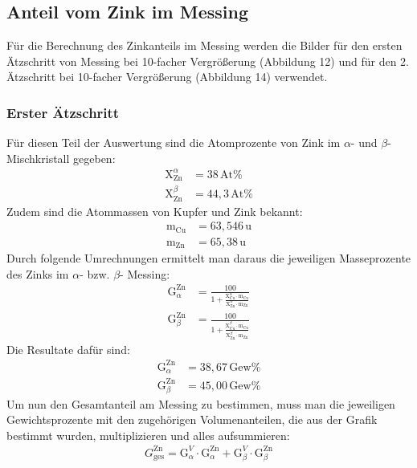 \documentclass[german,  %
parskip=full,  %
]{scrartcl}
\begin{document}
\subsection{Anteil vom Zink im Messing}
Für die Berechnung des Zinkanteils im Messing werden die Bilder für den ersten Ätzschritt von Messing bei 10-facher Vergrößerung (Abbildung 12) und für den 2. Ätzschritt bei 10-facher Vergrößerung (Abbildung 14) verwendet.
\subsubsection{Erster Ätzschritt}
Für diesen Teil der Auswertung sind die Atomprozente von Zink im $\alpha$- und $\beta$-Mischkristall gegeben:
\begin{align*}
\text{X}_{\text{Zn}}^{\alpha} &= 38 \, \text{At}\% \\
\text{X}_{\text{Zn}}^{\beta} &= 44,3 \, \text{At}\%
\end{align*}
Zudem sind die Atommassen von Kupfer und Zink bekannt:
\begin{align*}
\text{m}_{\text{Cu}} &= 63,546 \, \text{u} \\
\text{m}_{\text{Zn}} &= 65,38 \, \text{u}
\end{align*}
Durch folgende Umrechnungen ermittelt man daraus die jeweiligen Masseprozente des Zinks im $\alpha$- bzw. $\beta$- Messing:
\begin{align*}
\text{G}_{\alpha}^{\text{Zn}} &= \frac{100}{1+\frac{\text{X}_{\text{Cu}}^{\alpha} \cdot \text{m}_{\text{Cu}}}{\text{X}_{\text{Zn}}^{\alpha} \cdot \text{m}_{\text{Zn}}}} \\
\text{G}_{\beta}^{\text{Zn}} &= \frac{100}{1+\frac{\text{X}_{\text{Cu}}^{\beta} \cdot \text{m}_{\text{Cu}}}{\text{X}_{\text{Zn}}^{\beta} \cdot \text{m}_{\text{Zn}}}}
\end{align*}
Die Resultate dafür sind:
\begin{align*}
\text{G}_{\alpha}^{\text{Zn}} &= 38,67 \, \text{Gew}\% \\
\text{G}_{\beta}^{\text{Zn}} &= 45,00 \, \text{Gew}\%
\end{align*}
Um nun den Gesamtanteil am Messing zu bestimmen, muss man die jeweiligen Gewichtsprozente mit den zugehörigen Volumenanteilen, die aus der Grafik bestimmt wurden, multiplizieren und alles aufsummieren:
\begin{align*}
G_{\text{ges}}^{\text{Zn}} = \text{G}_{\alpha}^{V} \cdot \text{G}_{\alpha}^{\text{Zn}} + \text{G}_{\beta}^{V} \cdot \text{G}_{\beta}^{\text{Zn}}
\end{align*}
\end{document}
